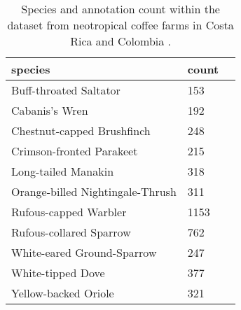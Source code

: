 
\begin{table}[t]
  
  \caption{Species and annotation count within the dataset from neotropical coffee farms in Costa Rica and Colombia \cite{vega-hidalgo_collection_2023}.}
  \label{tab:dataset}
  \centering
  \begin{tabular}{|l|l|c|}
    \hline
    species & count\\
    \hline
    Buff-throated Saltator & 153 \\
    Cabanis's Wren & 192 \\
    Chestnut-capped Brushfinch & 248 \\
    Crimson-fronted Parakeet & 215 \\
    Long-tailed Manakin & 318 \\
    Orange-billed Nightingale-Thrush & 311 \\
    Rufous-capped Warbler & 1153 \\
    Rufous-collared Sparrow & 762 \\
    White-eared Ground-Sparrow & 247 \\
    White-tipped Dove & 377 \\
    Yellow-backed Oriole & 321 \\
    \hline
  \end{tabular}
\end{table}